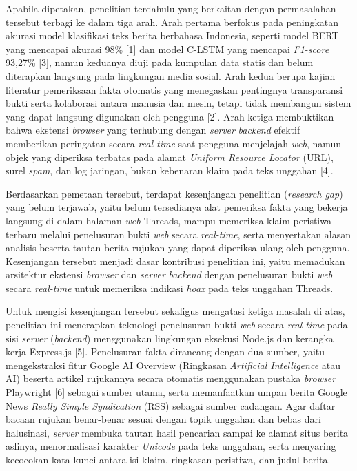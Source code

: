\documentclass[12pt,a4paper,twoside]{report}
\begin{document}
Apabila dipetakan, penelitian terdahulu yang berkaitan dengan permasalahan tersebut terbagi ke dalam tiga arah. Arah pertama berfokus pada peningkatan akurasi model klasifikasi teks berita berbahasa Indonesia, seperti model BERT yang mencapai akurasi 98\% [1] dan model C-LSTM yang mencapai \textit{F1-score} 93,27\% [3], namun keduanya diuji pada kumpulan data statis dan belum diterapkan langsung pada lingkungan media sosial. Arah kedua berupa kajian literatur pemeriksaan fakta otomatis yang menegaskan pentingnya transparansi bukti serta kolaborasi antara manusia dan mesin, tetapi tidak membangun sistem yang dapat langsung digunakan oleh pengguna [2]. Arah ketiga membuktikan bahwa ekstensi \textit{browser} yang terhubung dengan \textit{server} \textit{backend} efektif memberikan peringatan secara \textit{real-time} saat pengguna menjelajah \textit{web}, namun objek yang diperiksa terbatas pada alamat \textit{Uniform Resource Locator} (URL), surel \textit{spam}, dan log jaringan, bukan kebenaran klaim pada teks unggahan [4].

Berdasarkan pemetaan tersebut, terdapat kesenjangan penelitian (\textit{research gap}) yang belum terjawab, yaitu belum tersedianya alat pemeriksa fakta yang bekerja langsung di dalam halaman \textit{web} Threads, mampu memeriksa klaim peristiwa terbaru melalui penelusuran bukti \textit{web} secara \textit{real-time}, serta menyertakan alasan analisis beserta tautan berita rujukan yang dapat diperiksa ulang oleh pengguna. Kesenjangan tersebut menjadi dasar kontribusi penelitian ini, yaitu memadukan arsitektur ekstensi \textit{browser} dan \textit{server} \textit{backend} dengan penelusuran bukti \textit{web} secara \textit{real-time} untuk memeriksa indikasi \textit{hoax} pada teks unggahan Threads.

Untuk mengisi kesenjangan tersebut sekaligus mengatasi ketiga masalah di atas, penelitian ini menerapkan teknologi penelusuran bukti \textit{web} secara \textit{real-time} pada sisi \textit{server} (\textit{backend}) menggunakan lingkungan eksekusi Node.js dan kerangka kerja Express.js [5]. Penelusuran fakta dirancang dengan dua sumber, yaitu mengekstraksi fitur Google AI Overview (Ringkasan \textit{Artificial Intelligence} atau AI) beserta artikel rujukannya secara otomatis menggunakan pustaka \textit{browser} Playwright [6] sebagai sumber utama, serta memanfaatkan umpan berita Google News \textit{Really Simple Syndication} (RSS) sebagai sumber cadangan. Agar daftar bacaan rujukan benar-benar sesuai dengan topik unggahan dan bebas dari halusinasi, \textit{server} membuka tautan hasil pencarian sampai ke alamat situs berita aslinya, menormalisasi karakter \textit{Unicode} pada teks unggahan, serta menyaring kecocokan kata kunci antara isi klaim, ringkasan peristiwa, dan judul berita.
\end{document}
